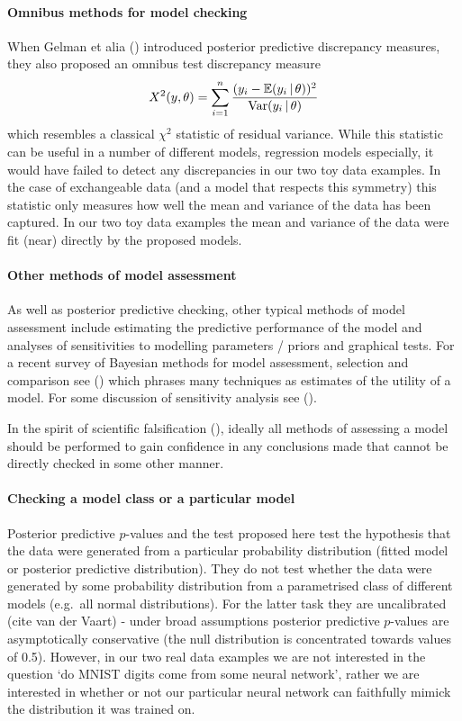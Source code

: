 \documentclass{article} %
\def\eg{e.g.\ }
\begin{document}
\paragraph{Omnibus methods for model checking}

When Gelman et alia () introduced posterior predictive discrepancy measures, they also proposed an omnibus test discrepancy measure
\begin{equation}
  X^2(y,\theta) = \sum_{i=1}^n \frac{(y_i-\mathbb{E}(y_i\,|\,\theta))^2}{\textrm{Var}(y_i\,|\,\theta)}
\end{equation}
which resembles a classical $\chi^2$ statistic of residual variance.
While this statistic can be useful in a number of different models, regression models especially, it would have failed to detect any discrepancies in our two toy data examples.
In the case of exchangeable data (and a model that respects this symmetry) this statistic only measures how well the mean and variance of the data has been captured.
In our two toy data examples the mean and variance of the data were fit (near) directly by the proposed models.

\paragraph{Other methods of model assessment}

As well as posterior predictive checking, other typical methods of model assessment include estimating the predictive performance of the model and analyses of sensitivities to modelling parameters / priors and graphical tests.
For a recent survey of Bayesian methods for model assessment, selection and comparison see () which phrases many techniques as estimates of the utility of a model.
For some discussion of sensitivity analysis see ().

In the spirit of scientific falsification (), ideally all methods of assessing a model should be performed to gain confidence in any conclusions made that cannot be directly checked in some other manner.

\paragraph{Checking a model class or a particular model}

Posterior predictive $p$-values and the test proposed here test the hypothesis that the data were generated from a particular probability distribution (fitted model or posterior predictive distribution).
They do not test whether the data were generated by some probability distribution from a parametrised class of different models (\eg all normal distributions).
For the latter task they are uncalibrated (cite van der Vaart) - under broad assumptions posterior predictive $p$-values are asymptotically conservative (the null distribution is concentrated towards values of 0.5).
However, in our two real data examples we are not interested in the question `do MNIST digits come from some neural network', rather we are interested in whether or not our particular neural network can faithfully mimick the distribution it was trained on.
\end{document}

